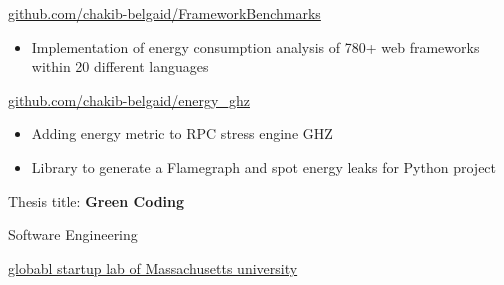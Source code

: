 \documentclass[10pt,a4paper,ragged2e,withhyper]{altacv}
\begin{document}
\begin{paracol}{2}
  \divider
   {\href{https://github.com/chakib-belgaid/FrameworkBenchmarks}{github.com/chakib-belgaid/FrameworkBenchmarks}}{}{}
  \begin{itemize}
    \item  Implementation of energy consumption analysis of 780+ web frameworks within 20 different languages
  \end{itemize}

  \divider
   {\href{https://github.com/chakib-belgaid/energy_ghz}{github.com/chakib-belgaid/energy\_ghz}}{}{}
  \begin{itemize}
    \item  Adding energy metric to RPC stress engine GHZ \end{itemize}
  \divider
  \begin{itemize}
    \item  Library to generate a Flamegraph and spot energy leaks for Python project
  \end{itemize}



  \medskip

  Thesis title: \textbf{Green Coding}

  \divider

  Software Engineering

  \divider

  \href{https://gsl.mit.edu/mit-global-startup-labs}{globabl startup lab of Massachusetts university}

  \medskip


  \medskip

  \divider


  \divider




\end{paracol}
\end{document}
